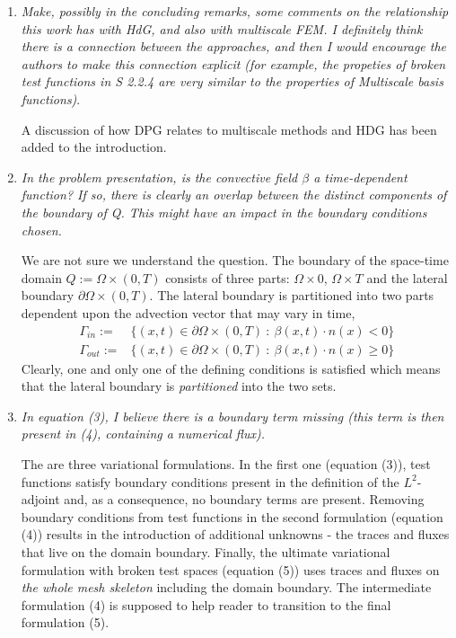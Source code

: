 \documentclass[11pt,c]{article}
\theoremstyle{remark}
\begin{document}
\begin{enumerate}

  \item {\em Make, possibly in the concluding remarks, some comments on the relationship this
work has with HdG, and also with multiscale FEM. I definitely think there is a connection
between the approaches, and then I would encourage the authors to make this connection
explicit (for example, the propeties of broken test functions in S 2.2.4 are very similar
to the properties of Multiscale basis functions)}.

A discussion of how DPG relates to multiscale methods and HDG has been added to the introduction.




  \item {\em In the problem presentation, is the convective field $\beta$ a time-dependent function?
If so, there is clearly an overlap between the distinct components of the boundary of Q.
This might have an impact in the boundary conditions chosen.}



We are not sure we understand the question. The boundary of the space-time domain 
$Q := \Omega \times (0,T)$ consists of three parts: $\Omega \times {0}$,
$\Omega \times {T}$ and the lateral boundary $\partial \Omega \times (0,T)$.
The lateral boundary is partitioned into two parts dependent upon the advection 
vector that may vary in time,
$$
\begin{array}{rl}
\Gamma_{in} := & \{ (x,t) \in \partial \Omega \times (0,T) \: : \:
\beta(x,t) \cdot n(x) < 0 \} \\
\Gamma_{out} := & \{ (x,t) \in \partial \Omega \times (0,T) \: : \:
\beta(x,t) \cdot n(x) \geq  0 \} 
\end{array}
$$
Clearly, one and only one of the defining conditions is satisfied which means
that the lateral boundary is {\em partitioned} into the two sets.





  \item {\em In equation (3), I believe there is a boundary term missing (this term is then present
in (4), containing a numerical flux).}

The are three variational formulations. In the first one (equation (3)), test functions
satisfy boundary conditions present in the definition of the $L^2$-adjoint and, as a consequence,
no boundary terms are present. Removing boundary conditions from test functions in the
second formulation (equation (4)) results in the introduction of additional unknowns - the
traces and fluxes that live on the domain boundary. Finally, the ultimate variational
formulation with broken test spaces (equation (5)) uses traces and fluxes on {\em the whole
mesh skeleton} including the domain boundary. The intermediate formulation (4) is supposed
to help reader to transition to the final formulation (5).



\end{enumerate}
\end{document}
